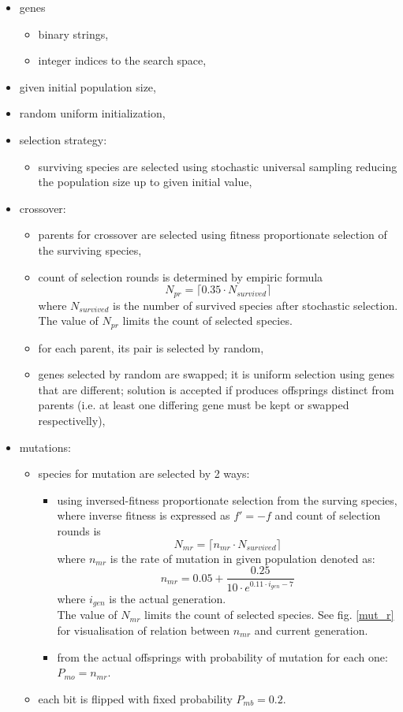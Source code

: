 \documentclass[a4paper,jurnal]{IEEEtran}
\begin{document}
\begin{itemize}
	\item genes 
	\begin{itemize}
		\item binary strings,
		\item integer indices to the search space,
	\end{itemize}
	\item given initial population size,
	\item random uniform initialization,
	\item selection strategy:
	\begin{itemize}
		\item surviving species are selected using stochastic universal 
		sampling reducing the population size up to given initial value,
	\end{itemize}
	\item crossover:
	\begin{itemize}
		\item parents for crossover are selected using fitness proportionate
		selection of the surviving species,
		\item count of selection rounds is determined by empiric formula
		\[ N_{pr} = \lceil 0.35\cdot N_{survived} \rceil \] 		
		where $ N_{survived} $ is the number of survived species after stochastic selection.
		The value of $ N_{pr} $ limits the count of selected species.
		\item for each parent, its pair is selected by random,
		\item genes selected by random are swapped; it is uniform selection using 
		genes that are different; solution is accepted if
		produces  offsprings distinct from parents (i.e. at least one differing gene must be kept or swapped respectivelly),
	\end{itemize}
\end{itemize}
\begin{itemize}
	\item mutations:
	\begin{itemize}
		\item species for mutation are selected by 2 ways:
		\begin{itemize}
			\item using inversed-fitness proportionate
			selection from the surving species, where inverse fitness is expressed as
			$ f'=-f  $
			and count of selection rounds is
			\[ N_{mr} = \lceil n_{mr}\cdot N_{survived} \rceil \]
			where 
			$ n_{mr} $  is the rate of mutation in given population denoted as:			
			\[ n_{mr} = 0.05+\dfrac{0.25}{10\cdot e^{0.11\cdot i_{gen}-7}}\]
			where
			$ i_{gen} $ is the actual generation.\\
			The value of $ N_{mr} $ limits the count of selected species. 
			See fig. \ref{mut_r} for visualisation of relation between $ n_{mr} $ 
			and current generation.
			\item from the actual offsprings with probability of mutation for each one:
			$ P_{mo} = n_{mr} $.
		\end{itemize}
		\item each bit is flipped with fixed probability
		$ P_{mb} = 0.2 $.
	\end{itemize}
\end{itemize}
\end{document}
